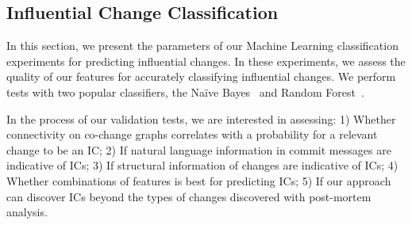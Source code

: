 



\subsection{Influential Change Classification}
\label{sec:classresults}

In this section, we present the parameters of our Machine Learning classification
experiments for predicting influential changes. In these experiments, we assess
the quality of our features for accurately classifying influential
changes. We perform tests with two
popular classifiers, the Na\"{i}ve Bayes~\cite{lewis:ecml:1998,mlbook}
and Random Forest~\cite{breiman_random_2001}.



In the process of our validation tests, we are interested in assessing: 1)
Whether connectivity on co-change graphs correlates with a probability
for a relevant change to be an IC; 2) If natural language information in
commit messages are indicative of ICs; 3) If structural information of changes
are indicative of ICs; 4) Whether combinations of features is best for
predicting ICs; 5) If our approach can discover ICs beyond the types of
changes discovered with post-mortem analysis.


